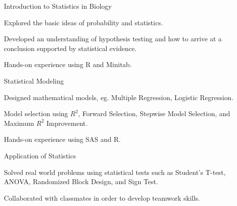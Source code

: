 

\begin{cventries}

  \cventry
    {Introduction to Statistics in Biology} %
    {} %
    {} %
    {} %
    {
    \begin{cvitems}
    \item Explored the basic ideas of probability and statistics.
    \item Developed an understanding of hypothesis testing and how to arrive at a conclusion supported by statistical evidence.
    \item Hands-on experience using R and Minitab.
    \end{cvitems}
    }

  \cventry
    {Statistical Modeling} %
    {} %
    {} %
    {} %
    {
      \begin{cvitems}
      \item Designed mathematical models, eg. Multiple Regression, Logistic Regression.
      \item Model selection using $R^2$, Forward Selection, Stepwise Model Selection, and Maximum $R^2$ Improvement.
      \item Hands-on experience using SAS and R.
      \end{cvitems}
    }

      \cventry
    {Application of Statistics} %
    {} %
    {} %
    {} %
    {
      \begin{cvitems}
      \item Solved real world problems using statistical tests such as Student's T-test, ANOVA, Randomized Block Design, and Sign Test.
        \item Collaborated with classmates in order to develop teamwork skills.
      \end{cvitems}
    }
\end{cventries}
